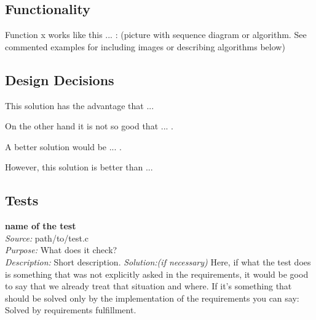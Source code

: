     \subsection{Functionality}

	Function x works like this ... : (picture with sequence diagram or algorithm. See commented examples for including images or describing algorithms below)






    \subsection{Design Decisions}

	This solution has the advantage that ... 

	On the other hand it is not so good that ... . 

	A better solution would be ... . 

	However, this solution is better than ...

    \subsection{Tests}

    \textbf{name of the test}\\
    \textit{Source:} path/to/test.c\\
    \textit{Purpose:} What does it check?\\
    \textit{Description:} Short description.
    \textit{Solution:(if necessary)} Here, if what the test does is something that was not explicitly asked in the requirements, it would be good to say that we already treat that situation and where. If it's something that should be solved only by the implementation of the requirements you can say: Solved by requirements fulfillment.
